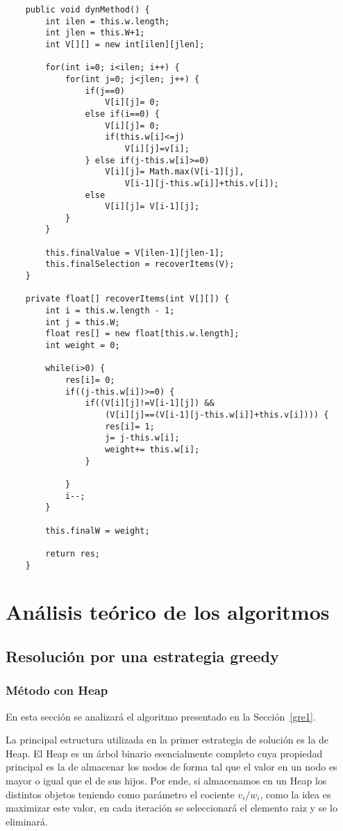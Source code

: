 \documentclass[a4paper,10pt,spanish]{article}
\begin{document}
	\label{dyn1}
		\begin{lstlisting}
	public void dynMethod() {
		int ilen = this.w.length;
		int jlen = this.W+1;
		int V[][] = new int[ilen][jlen];
		
		for(int i=0; i<ilen; i++) {
			for(int j=0; j<jlen; j++) {
				if(j==0)
					V[i][j]= 0;
				else if(i==0) {
					V[i][j]= 0;
					if(this.w[i]<=j)
						V[i][j]=v[i];
				} else if(j-this.w[i]>=0)
					V[i][j]= Math.max(V[i-1][j], 
						V[i-1][j-this.w[i]]+this.v[i]);
				else
					V[i][j]= V[i-1][j];
			}
		}
		
		this.finalValue = V[ilen-1][jlen-1];
		this.finalSelection = recoverItems(V);
	}
	
	private float[] recoverItems(int V[][]) {
		int i = this.w.length - 1;
		int j = this.W;
		float res[] = new float[this.w.length];
		int weight = 0;
		
		while(i>0) {
			res[i]= 0;
			if((j-this.w[i])>=0) {
				if((V[i][j]!=V[i-1][j]) && 
					(V[i][j]==(V[i-1][j-this.w[i]]+this.v[i]))) {
					res[i]= 1;
					j= j-this.w[i];
					weight+= this.w[i];
				}
					
			}
			i--;
		}
		
		this.finalW = weight;
		
		return res;
	}
		\end{lstlisting}

\newpage
\section{An\'alisis te\'orico de los algoritmos}
	\subsection{Resoluci\'on por una estrategia greedy}
		\subsubsection{M\'etodo con Heap}
		En esta secci\'on se analizar\'a el algoritmo presentado en la Secci\'on~\ref{gre1}.
		
		\vspace{4mm}
		La principal estructura utilizada en la primer estrategia de soluci\'on es la de Heap. El Heap es un \'arbol binario esencialmente completo cuya propiedad principal es la de almacenar los nodos de forma tal que el valor en un nodo es mayor o igual que el de sus hijos. Por ende, si almacenamos en un Heap los distintos objetos teniendo como par\'ametro el cociente $v_i/w_i$, como la idea es maximizar este valor, en cada iteraci\'on se seleccionar\'a el elemento raiz y se lo eliminar\'a.
\end{document}
